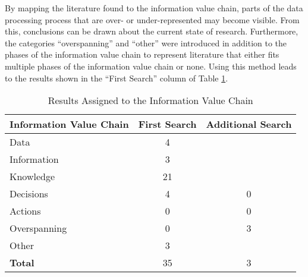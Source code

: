By mapping the literature found to the information value chain, parts of the data processing process that are over- or under-represented may become visible. From this, conclusions can be drawn about the current state of research. Furthermore, the categories \enquote{overspanning} and \enquote{other} were introduced in addition to the phases of the information value chain to represent literature that either fits multiple phases of the information value chain or none. Using this method leads to the results shown in the \enquote{First Search} column of Table \ref{informationValueChainResults}.


\begin{table}[htbp]
    \centering
    \small
    \begin{tabular}{lcc}
    \hline
    \multicolumn{1}{c}{Information Value Chain}  & First Search & \multicolumn{1}{l}{Additional Search} \\ \hline
    Data                                         & 4            &                                       \\
    Information                                  & 3            &                                       \\
    Knowledge                                    & 21           &                                       \\
    Decisions                                    & 4            & 0                                      \\
    Actions                                      & 0            & 0                                      \\
    Overspanning                                 & 0            & 3                                     \\
    Other                                        & 3            &                                       \\ \hline
    \textbf{Total}                               & 35           & 3                                     \\ \hline
    \end{tabular}
    \caption{Results Assigned to the Information Value Chain}
    \label{informationValueChainResults}
    \end{table}


